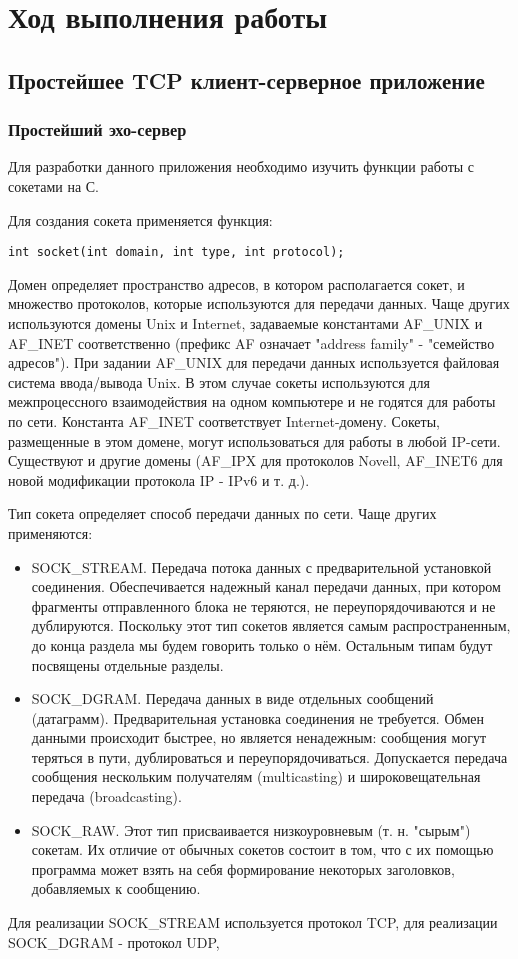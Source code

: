 \section{Ход выполнения работы}

\subsection{Простейшее TCP клиент-серверное приложение}

\subsubsection{Простейший эхо-сервер}

Для разработки данного приложения необходимо изучить функции работы с сокетами на С.

Для создания сокета применяется функция:
\begin{lstlisting}
int socket(int domain, int type, int protocol);
\end{lstlisting}

Домен определяет пространство адресов, в котором располагается сокет, и множество протоколов, которые используются для передачи данных. Чаще других используются домены Unix и Internet, задаваемые константами AF\_UNIX и AF\_INET соответственно (префикс AF означает "address family" - "семейство адресов"). При задании AF\_UNIX для передачи данных используется файловая система ввода/вывода Unix. В этом случае сокеты используются для межпроцессного взаимодействия на одном компьютере и не годятся для работы по сети. Константа AF\_INET соответствует Internet-домену. Сокеты, размещенные в этом домене, могут использоваться для работы в любой IP-сети. Существуют и другие домены (AF\_IPX для протоколов Novell, AF\_INET6 для новой модификации протокола IP - IPv6 и т. д.).

Тип сокета определяет способ передачи данных по сети. Чаще других применяются:
\begin{itemize}
\item SOCK\_STREAM. Передача потока данных с предварительной установкой соединения. Обеспечивается надежный канал передачи данных, при котором фрагменты отправленного блока не теряются, не переупорядочиваются и не дублируются. Поскольку этот тип сокетов является самым распространенным, до конца раздела мы будем говорить только о нём. Остальным типам будут посвящены отдельные разделы.
\item SOCK\_DGRAM. Передача данных в виде отдельных сообщений (датаграмм). Предварительная установка соединения не требуется. Обмен данными происходит быстрее, но является ненадежным: сообщения могут теряться в пути, дублироваться и переупорядочиваться. Допускается передача сообщения нескольким получателям (multicasting) и широковещательная передача (broadcasting).
\item SOCK\_RAW. Этот тип присваивается низкоуровневым (т. н. "сырым") сокетам. Их отличие от обычных сокетов состоит в том, что с их помощью программа может взять на себя формирование некоторых заголовков, добавляемых к сообщению.
\end{itemize}
Для реализации SOCK\_STREAM используется протокол TCP, для реализации SOCK\_DGRAM - протокол UDP,

